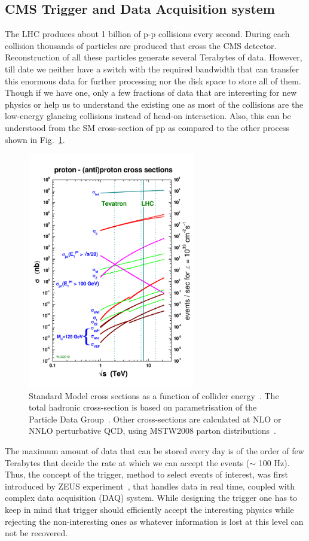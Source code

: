 \subsection{CMS Trigger and Data Acquisition system} %
\label{sub:cms_trigger_and_data_acquisition_system}
The LHC produces about 1 billion of p-p collisions every second.
During each collision thousands of particles are produced that cross the CMS detector.
Reconstruction of all these particles generate several Terabytes of data.
However, till date we neither have a switch with the required bandwidth that can transfer this enormous data for further processing nor the disk space to store all of them.
Though if we have one, only a few fractions of data that are interesting for new physics or help us to understand the existing one as most of the collisions are the low-energy glancing collisions instead of head-on interaction.
Also, this can be understood from the SM cross-section of pp as compared to the other process shown in Fig.~\ref{fig:SM-cross-section}.
\begin{figure}[!htbp]
	\centering
	\includegraphics[width=0.65\textwidth]{figures/LHC/crosssections2012_v5.pdf}
	\caption{Standard Model cross sections as a function of collider energy~\cite{Stirling2012}. The total hadronic cross-section is based on parametrisation of the Particle Data Group~\cite{PDG2018}. Other cross-sections are calculated at NLO or NNLO perturbative QCD, using MSTW2008 parton distributions~\cite{Martin2009}.}
	\label{fig:SM-cross-section}
\end{figure}
The maximum amount of data that can be stored every day is of the order of few Terabytes that decide the rate at which we can accept the events ($\sim$ 100 Hz).
Thus, the concept of the trigger, method to select events of interest, was first introduced by ZEUS experiment~\cite{ZEUSCollaboration1993}, that handles data in real time, coupled with complex data acquisition (DAQ) system.
While designing the trigger one has to keep in mind that trigger should efficiently accept the interesting physics while rejecting the non-interesting ones as whatever information is lost at this level can not be recovered.

